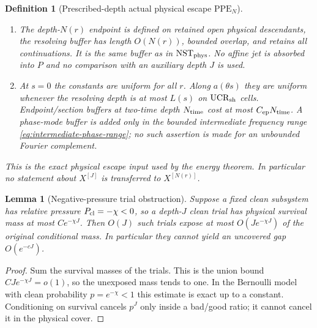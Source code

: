 \documentclass[11pt]{article}
\newtheorem{lemma}[theorem]{Lemma}
\newtheorem{definition}[theorem]{Definition}
\begin{document}
\begin{definition}[Prescribed-depth actual physical escape
$\mathrm{PPE}_{N}$]
\begin{enumerate}[label=\textup{(PPE\arabic*)}]
      $N(r)$ are bounded by the marks already charged in
      \eqref{eq:event-physical-norm}.  This local clause does not control
      context, stopping, buffer, gate, or continuation failures and does not
      by itself imply the full-$\mathscr W_*$ estimate
      \eqref{eq:tilted-PPE-tail}.
\item The depth-$N(r)$ endpoint is defined on retained open physical
      descendants, the resolving buffer has length $O(N(r))$, bounded
      overlap, and retains all continuations.  It is the same buffer as in
      $\mathrm{NST}_{\rm phys}$.  No affine jet is absorbed into $P$ and no
      comparison with an auxiliary depth $J$ is used.
\item At $s=0$ the constants are uniform for all $r$.  Along
      $a(\theta s)$ they are uniform whenever the resolving depth is at most
      $L(s)$ on $\mathrm{UCR}_{\rm sh}$ cells.  Endpoint/section buffers at
      two-time depth $N_{\rm time}$ cost at most
      $C_{\rm ep}N_{\rm time}$.  A phase-mode buffer is added only in the
      bounded intermediate frequency range
      \eqref{eq:intermediate-phase-range}; no such assertion is made for an
      unbounded Fourier complement.
\end{enumerate}
This is the exact physical escape input used by the energy theorem.  In
particular no statement about $X^{[J]}$ is transferred to $X^{[N(r)]}$.
\end{definition}

\begin{lemma}[Negative-pressure trial obstruction]
\label{lem:negative-pressure-trial-obstruction}
Suppose a fixed clean subsystem has relative pressure
$P_{\rm cl}=-\chi<0$, so a depth-$J$ clean trial has physical survival mass
at most $Ce^{-\chi J}$.  Then $O(J)$ such trials expose at most
$O(Je^{-\chi J})$ of the original conditional mass.  In particular they
cannot yield an uncovered gap $O(e^{-cJ})$.
\end{lemma}

\begin{proof}
Sum the survival masses of the trials.  This is the union bound
$CJ e^{-\chi J}=o(1)$, so the unexposed mass tends to one.  In the Bernoulli
model with clean probability $p=e^{-\chi}<1$ this estimate is exact up to a
constant.  Conditioning on survival cancels $p^J$ only inside a bad/good
ratio; it cannot cancel it in the physical cover.
\end{proof}
\end{document}
